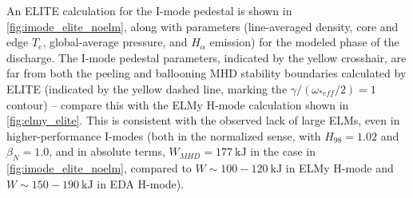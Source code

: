 An ELITE calculation for the I-mode pedestal is shown in \cref{fig:imode_elite_noelm}, along with parameters (line-averaged density, core and edge $T_e$, global-average pressure, and $H_\alpha$ emission) for the modeled phase of the discharge.  The I-mode pedestal parameters, indicated by the yellow crosshair, are far from both the peeling and ballooning MHD stability boundaries calculated by ELITE (indicated by the yellow dashed line, marking the $\gamma/(\omega_{*eff}/2) = 1$ contour) -- compare this with the ELMy H-mode calculation shown in \cref{fig:elmy_elite}.  This is consistent with the observed lack of large ELMs, even in higher-performance I-modes (both in the normalized sense, with $H_{98} = 1.02$ and $\beta_N = 1.0$, and in absolute terms, $W_{MHD} = \SI{177}{\kilo\joule}$ in the case in \cref{fig:imode_elite_noelm}, compared to $W \sim 100-\SI{120}{\kilo\joule}$ in ELMy H-mode and $W \sim 150-\SI{190}{\kilo\joule}$ in EDA H-mode).

\begin{figure}[h]
 \pushtooutside
\end{figure}

